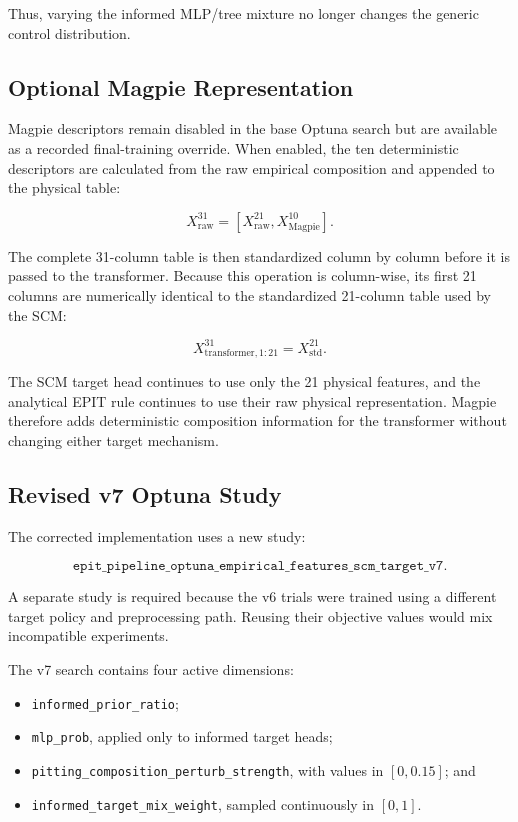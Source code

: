 \documentclass{article}
\begin{document}
Thus, varying the informed MLP/tree mixture no longer changes the generic
control distribution.

\subsection{Optional Magpie Representation}

Magpie descriptors remain disabled in the base Optuna search but are available
as a recorded final-training override. When enabled, the ten deterministic
descriptors are calculated from the raw empirical composition and appended to
the physical table:

\[
X_{\mathrm{raw}}^{31}
=
\left[
X_{\mathrm{raw}}^{21},
X_{\mathrm{Magpie}}^{10}
\right].
\]

The complete 31-column table is then standardized column by column before it
is passed to the transformer. Because this operation is column-wise, its first
21 columns are numerically identical to the standardized 21-column table used
by the SCM:

\[
X_{\mathrm{transformer},1:21}^{31}
=
X_{\mathrm{std}}^{21}.
\]

The SCM target head continues to use only the 21 physical features, and the
analytical EPIT rule continues to use their raw physical representation.
Magpie therefore adds deterministic composition information for the
transformer without changing either target mechanism.

\subsection{Revised v7 Optuna Study}

The corrected implementation uses a new study:

\[
\texttt{epit\_pipeline\_optuna\_empirical\_features\_scm\_target\_v7}.
\]

A separate study is required because the v6 trials were trained using a
different target policy and preprocessing path. Reusing their objective values
would mix incompatible experiments.

The v7 search contains four active dimensions:

\begin{itemize}
    \item \texttt{informed\_prior\_ratio};
    \item \texttt{mlp\_prob}, applied only to informed target heads;
    \item \texttt{pitting\_composition\_perturb\_strength},
    with values in \([0,0.15]\); and
    \item \texttt{informed\_target\_mix\_weight},
    sampled continuously in \([0,1]\).
\end{itemize}
\end{document}
